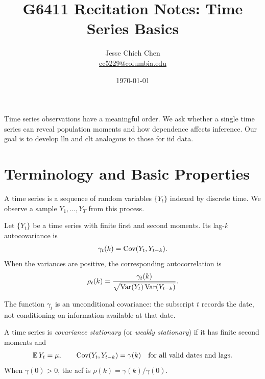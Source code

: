 \documentclass[a4paper,12pt]{article}
\title{G6411 Recitation Notes: Time Series Basics}
\author{Jesse Chieh Chen\\\href{mailto:cc5229@columbia.edu}{cc5229@columbia.edu}}
\date{\today}
\begin{document}
\maketitle

\noindent
Time series observations have a meaningful order.
We ask whether a single time series can reveal population moments and how dependence affects inference.
Our goal is to develop \gls{lln} and \gls{clt} analogous to those for \gls{iid} data.

\section{Terminology and Basic Properties}

\begin{definition}\label{def-time-series}
	A time series is a sequence of random variables $\{Y_t\}$ indexed by discrete time.
	We observe a sample $Y_1,\ldots,Y_T$ from this process.
\end{definition}

\begin{definition}
	Let $\{Y_t\}$ be a time series with finite first and second moments.
	Its lag-$k$ autocovariance is
	\begin{align}
		\gamma_t(k)=\operatorname{\text{\upshape{Cov}}}(Y_t,Y_{t-k}).
	\end{align}
	When the variances are positive, the corresponding autocorrelation is
	\begin{align}
		\rho_t(k)=\frac{\gamma_t(k)}
		{\sqrt{\operatorname{\text{\upshape{Var}}}(Y_t)\operatorname{\text{\upshape{Var}}}(Y_{t-k})}}.
	\end{align}
\end{definition}

\begin{remark}
	The function $\gamma_t$ is an unconditional covariance:
	the subscript $t$ records the date, not conditioning on information available at that date.
\end{remark}

\begin{definition}\label{def-cov-stationary}
	A time series is \emph{covariance stationary} (or \emph{weakly stationary}) if it has finite second moments and
	\begin{align}
		\operatorname{\mathbb{E}} Y_t=\mu,\qquad \operatorname{\text{\upshape{Cov}}}(Y_t,Y_{t-k})=\gamma(k)
		\quad\text{for all valid dates and lags}.
	\end{align}
	When $\gamma(0)>0$, the \gls{acf} is $\rho(k)=\gamma(k)/\gamma(0)$.
\end{definition}
\end{document}
